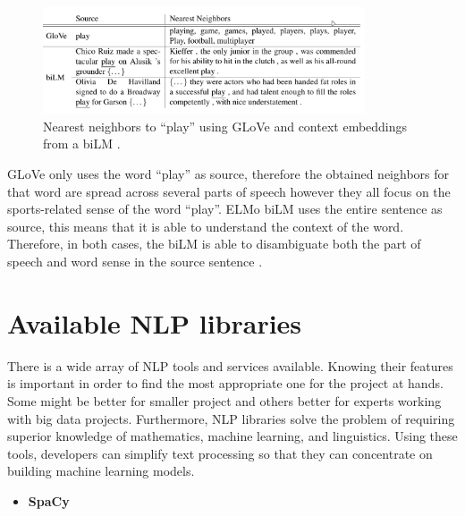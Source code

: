             
        \begin{figure}[H]
            \centering
            \captionsetup{justification=centering}
            \includegraphics[width=0.85\textwidth]{Sections/3StateOfTheArt/3_images/ELMO.png}
            \caption[Nearest neighbors to \enquote{play} using GLoVe]{Nearest neighbors to \enquote{play} using GLoVe and context embeddings from a biLM \cite{Peters:2018}.} 
            \label{fig:diffe}
        \end{figure}

        \par GLoVe only uses the word \enquote{play} as source, therefore the obtained neighbors for that word are spread across several parts of speech however they all focus on the sports-related sense of the word \enquote{play}. ELMo biLM uses the entire sentence as source, this means that it is able to understand the context of the word. Therefore, in both cases, the biLM is able to disambiguate both the part of speech and word sense in the source sentence \cite{Peters:2018}.
        

       
\section{Available NLP libraries}
    \label{sec:libraries}

    There is a wide array of NLP tools and services available. Knowing their features is important in order to find the most appropriate one for the project at hands. Some might be better for smaller project and others better for experts working with big data projects. Furthermore, NLP libraries solve the problem of requiring superior knowledge of mathematics, machine learning, and linguistics. Using these tools, developers can simplify text processing so that they can concentrate on building machine learning models. 



        \begin{itemize}
            \item\textbf{SpaCy}
        \end{itemize}
      
